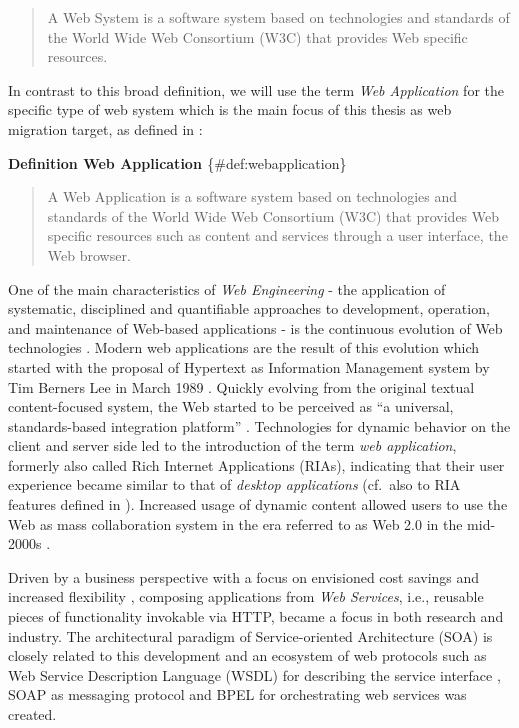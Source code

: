 \begin{quote}
A Web System is a software system based on technologies and standards of the World Wide Web Consortium (W3C) that provides Web specific resources.
\end{quote}

In contrast to this broad definition, we will use the term \emph{Web Application} for the specific type of web system which is the main focus of this thesis as web migration target, as defined in \autocite{Kappel2006WebEngineering}:

\textbf{Definition Web Application \autocite{Kappel2006WebEngineering}} \{\#def:webapplication\}

\begin{quote}
A Web Application is a software system based on technologies and standards of the World Wide Web Consortium (W3C) that provides Web specific resources such as content and services through a user interface, the Web browser.
\end{quote}

One of the main characteristics of \emph{Web Engineering} - the application of systematic, disciplined and quantifiable approaches to development, operation, and maintenance of Web-based applications \autocite{Deshpande2002WebEngineering} - is the continuous evolution of Web technologies \autocite{Gitzel2007WebEngineeringMDD}.
Modern web applications are the result of this evolution \autocite{Kienle2014EvolutionWeb} which started with the proposal of Hypertext as Information Management system by Tim Berners Lee in March 1989 \autocite{Berners-Lee1989}.
Quickly evolving from the original textual content-focused system, the Web started to be perceived as ``a universal, standards-based integration platform'' \autocite{Knorr2003WebAsPlatform}.
Technologies for dynamic behavior on the client and server side led to the introduction of the term \emph{web application}, formerly also called Rich Internet Applications (RIAs), indicating that their user experience became similar to that of \emph{desktop applications} \autocite{Kienle2014EvolutionWeb} (cf.~also to RIA features defined in \autocite{Rodriguez-Echeverria2012MIGRARIA}).
Increased usage of dynamic content allowed users to use the Web as mass collaboration system in the era referred to as Web 2.0 in the mid-2000s \autocite{OReilly2005Web2.0}.

Driven by a business perspective with a focus on envisioned cost savings and increased flexibility \autocite{Kienle2014EvolutionWeb}, composing applications from \emph{Web Services}, i.e., reusable pieces of functionality invokable via HTTP, became a focus in both research and industry.
The architectural paradigm of Service-oriented Architecture (SOA) \autocite{Oasis2006SOA} is closely related to this development and an ecosystem of web protocols such as Web Service Description Language (WSDL) for describing the service interface \autocite{W3C2007WSDL2.0}, SOAP as messaging protocol \autocite{W3C2003SOAP} and BPEL for orchestrating web services \autocite{OASIS2007BPEL} was created.

